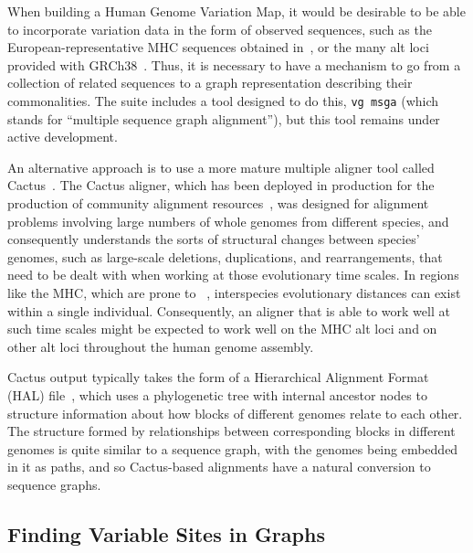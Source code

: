 When building a Human Genome Variation Map, it would be desirable to be able to incorporate variation data in the form of observed sequences, such as the European-representative MHC sequences obtained in~\citet{horton2008variation}, or the many alt loci provided with GRCh38~\cite{karolchik2014new}. Thus, it is necessary to have a mechanism to go from a collection of related sequences to a graph representation describing their commonalities. The \vg suite includes a tool designed to do this, \texttt{vg msga} (which stands for ``multiple sequence graph alignment''), but this tool remains under active development.

An alternative approach is to use a more mature multiple aligner tool called Cactus~\cite{paten2011cactus2}. The Cactus aligner, which has been deployed in production for the production of community alignment resources~\cite{howe2015wormbase}, was designed for alignment problems involving large numbers of whole genomes from different species, and consequently understands the sorts of structural changes between species' genomes, such as large-scale deletions, duplications, and rearrangements, that need to be dealt with when working at those evolutionary time scales. In regions like the MHC, which are prone to ~\cite{prufer2012bonobo}, interspecies evolutionary distances can exist within a single individual. Consequently, an aligner that is able to work well at such time scales might be expected to work well on the MHC alt loci and on other alt loci throughout the human genome assembly.

Cactus output typically takes the form of a Hierarchical Alignment Format (HAL) file~\cite{hickey2013hal,howe2015wormbase}, which uses a phylogenetic tree with internal ancestor nodes to structure information about how blocks of different genomes relate to each other. The structure formed by relationships between corresponding blocks in different genomes is quite similar to a sequence graph, with the genomes being embedded in it as paths, and so Cactus-based alignments have a natural conversion to sequence graphs.

\subsection{Finding Variable Sites in Graphs}

